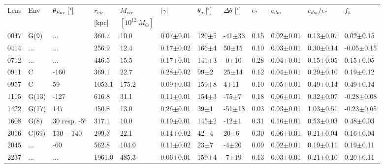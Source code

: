 \documentclass[useAMS,usenatbib]{mn2e}
\begin{document}
\begin{table}
  \begin{center}
    \begin{tabular}{l l l l l l l l l l l l}
      \multirow{2}{*}{Lens} & \multirow{2}{*}{Env} & \multirow{2}{*}{$\theta_{Env}$ [$^{\circ}$]} & $r_{vir}$ & $M_{vir}$ & \multirow{2}{*}{$|\gamma|$} & \multirow{2}{*}{$\theta_{g}$ [$^{\circ}$]} & \multirow{2}{*}{$\Delta\theta$ [$^{\circ}$]} & \multirow{2}{*}{$e_{*}$} & \multirow{2}{*}{$e_{dm}$} & \multirow{2}{*}{$e_{dm}/e_{*}$} & \multirow{2}{*}{$f_h$} \\
       & & & [kpc] & $[10^{12} \ M_{\odot}]$ & & & & & & & \\ \hline
      0047 & G(9) & ... & 360.7 & 10.0 & 0.07$\pm$0.01 & 120$\pm$5 & -41$\pm$33 & 0.15 & 0.02$\pm$0.01 & 0.13$\pm$0.07 & 0.02$\pm$0.15 \\
      0414 & ... & ... & 256.9 & 12.4 & 0.17$\pm$0.02 & 166$\pm$4 & 50$\pm$15 & 0.10 & 0.03$\pm$0.01 & 0.30$\pm$0.14 & -0.05$\pm$0.15 \\
      0712 & ... & ... & 446.5 & 15.5 & 0.17$\pm$0.01 & 141$\pm$3 & -0$\pm$10 & 0.28 & 0.04$\pm$0.01 & 0.15$\pm$0.05 & 0.15$\pm$0.05 \\
      0911 & C & -160 & 369.1 & 22.7 & 0.28$\pm$0.02 & 99$\pm$2 & 25$\pm$14 & 0.12 & 0.04$\pm$0.01 & 0.29$\pm$0.10 & 0.19$\pm$0.12 \\
      0957 & C & 59 & 1053.1 & 175.2 & 0.09$\pm$0.03 & 159$\pm$8 & 4$\pm$11 & 0.10 & 0.05$\pm$0.01 & 0.49$\pm$0.14 & 0.49$\pm$0.14 \\
      1115 & G(13) & -127 & 616.8 & 31.1 & 0.11$\pm$0.01 & 154$\pm$3 & -75$\pm$7 & 0.18 & 0.06$\pm$0.01 & 0.32$\pm$0.07 & -0.28$\pm$0.08 \\
      1422 & G(17) & 147 & 450.8 & 13.0 & 0.26$\pm$0.01 & 39$\pm$1 & -51$\pm$18 & 0.03 & 0.03$\pm$0.01 & 1.03$\pm$0.51 & -0.23$\pm$0.65 \\
      1608 & G(8) & 30 resp. -5$^{a}$ & 317.1 & 10.0 & 0.19$\pm$0.01 & 145$\pm$2 & -12$\pm$1 & 0.31 & 0.16$\pm$0.01 & 0.53$\pm$0.03 & 0.48$\pm$0.03 \\
      2016 & C(69) & $130-140$ & 299.3 & 22.1 & 0.14$\pm$0.02 & 42$\pm$4 & 20$\pm$6 & 0.30 & 0.06$\pm$0.01 & 0.21$\pm$0.04 & 0.16$\pm$0.04 \\
      2045 & ... & -60 & 562.8 & 104.0 & 0.11$\pm$0.02 & 23$\pm$7 & -4$\pm$20 & 0.09 & 0.02$\pm$0.01 & 0.19$\pm$0.11 & 0.19$\pm$0.11 \\
      2237 & ... & ... & 1961.0 & 485.3 & 0.06$\pm$0.01 & 159$\pm$4 & -7$\pm$19 & 0.13 & 0.03$\pm$0.01 & 0.21$\pm$0.10 & 0.20$\pm$0.11 \\

\end{tabular}
\end{center}
\end{table}
\end{document}
